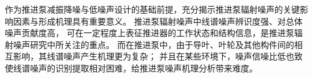 \cleardoublepage
{}
\begin{comment}
目前船艇推进系统对高效低噪声推进泵的需求日益迫切，
在满足推进性能需求的基础上，
推进泵水下噪声已经成为一项关键技术指标。
为了更好的服务于推进泵低噪声设计，
有必要对推进泵噪声的声纹特征进行研究。
噪声的特征线谱是推进泵噪声研究中所关注的重点，
特征线谱不仅能表征推进泵的工作状态和结构信息，
也是声呐系统追踪和识别的重要信息，
但是其提取面临环境干扰强、直接测量难度大的问题。
因此，本文围绕推进泵噪声的声纹特征展开，针对噪声特征线谱提取的需求，
以紧凑型前置导叶的单级推进泵和新型结构的双级推进泵为研究对象，
设计噪声测试与分析系统并开展试验研究，
研究了推进泵噪声的声纹特征，
基于循环平稳分析方法实现了推进泵噪声的特征线谱提取。
本文主要研究内容包括以下几个方面：

（1）基于LabVIEW设计了推进泵噪声测试与分析系统。
其中涵盖了传感器、数据采集等硬件设计，以及信号分析、显示、存储等软件模块的设计。
该系统支持同步对多通道传感器信号实时采集，各通道信号同时分析、显示及存储，
具有操作简单、经济高效等优势。
基于系统的信号分析模块，可实现对噪声的频段能量分布特点、特征频段总声压量级、频谱特征等声纹特征分析。

（2）以紧凑型前置导叶的单级推进泵和新型结构的双级推进泵为研究对象，
在大型空泡水洞中对其分别开展了噪声试验。
在考虑背景噪声影响的基础上，
研究不同工况下推进泵噪声的声纹特征变化，
以及流速等与噪声的声学关联性。
结果表明，中低频段噪声对推进泵噪声有显著贡献。
噪声中低频段、高频段和全频段的总声压级随着流速的增大而增大，
流速变化对推进泵噪声能量分布和总声压级影响主要体现在中低频段。
两种形式的推进泵噪声频谱均表现为中低频线谱噪声、中低频宽带噪声和高频宽带噪声。

（3）开展了推进泵噪声信号的特性研究。
结合推进泵噪声信号产生的机理和噪声信号特征，对噪声信号进行了
组分分析。推进泵噪声信号成分主要包括确定性信号分量、调制信号分量和环境噪声信号分量。
基于推进泵噪声信号的循环平稳特性和各组分的特点，
对匀速运转工况下的无空化噪声信号建立了幅值调制信号模型，
采用循环平稳分析方法对噪声信号的仿真模型进行了研究，
验证了循环平稳解调算法提取多组分调制频率的有效性和良好的抗噪性能。
 
（4）推进泵噪声的特征线谱提取和分析。针对噪声特征线谱提取的需求，
基于循环平稳分析方法实现了推进泵低频线谱的提取。
为了验证循环平稳分析方法提取特征线谱的可行性，采用 CFD 数
值模拟获得了推进泵脉动力特征，
结果表明循环平稳分析方法提取出的低频线谱成分可以和非定常脉动力的特征线谱对应起来。
同时，对推进泵噪声的调制特性进行了研究，
发现推进泵噪声信号具有强烈的调制特征，其中轴频和动叶叶频为主要的调制频率。
随着流速的增大，动叶叶频的调制效应也愈发显著。

\end{comment}
作为推进泵减振降噪与低噪声设计的基础前提，充分揭示推进泵辐射噪声的关键影响因素与形成机理具有重要意义。
推进泵辐射噪声中线谱噪声辨识度强、对总体噪声贡献度高，
可在一定程度上表征推进器的工作状态和结构信息，是推进泵辐射噪声研究中所关注的重点。
而在推进泵中，由于导叶、叶轮及其他构件间的相互影响，其线谱噪声产生机理更为复杂；
并且在某些环境下，噪声信噪比低也致使线谱噪声的识别提取相对困难，给推进泵噪声机理分析带来难度。

